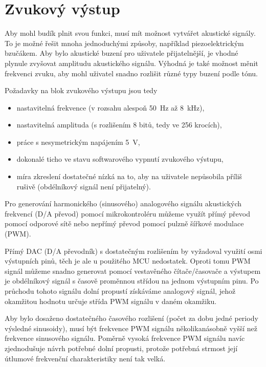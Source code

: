 \section{Zvukový výstup}
Aby mohl budík plnit svou funkci, musí mít možnost vytvářet akustické signály.
To je možné řešit mnoha jednoduchými způsoby, například piezoelektrickým
bzučákem. Aby bylo akustické buzení pro uživatele přijatelnější, je vhodné
plynule zvyšovat amplitudu akustického signálu. Výhodná je také možnost měnit
frekvenci zvuku, aby mohl uživatel snadno rozlišit různé typy buzení podle
tónu.

Požadavky na blok zvukového výstupu jsou tedy
\begin{itemize}[nosep]
    \item nastavitelná frekvence (v rozsahu alespoň \SI{50}{\hertz} až
        \SI{8}{\kilo\hertz}),
    \item nastavitelná amplituda (s rozlišením 8 bitů, tedy ve 256 krocích),
    \item práce s nesymetrickým napájením \SI{5}{\volt},
    \item dokonalé ticho ve stavu softwarového vypnutí zvukového výstupu,
    \item míra zkreslení dostatečné nízká na to, aby na uživatele nepůsobila
        příliš rušivě (obdélníkový signál není přijatelný).
\end{itemize}

Pro generování harmonického (sinusového) analogového signálu akustických
frekvencí (D/A převod) pomocí mikrokontroléru můžeme využít přímý převod pomocí
odporové sítě nebo nepřímý převod pomocí pulzně šířkové modulace (PWM).

Přímý DAC (D/A převodník) s dostatečným rozlišením by vyžadoval využití osmi
výstupních pinů, těch je ale u použitého MCU nedostatek. Oproti tomu PWM signál
můžeme snadno generovat pomocí vestavěného čítače/časovače a výstupem je
obdélníkový signál s časově proměnnou střídou na jednom výstupním pinu. Po
průchodu tohoto signálu dolní propustí získáváme analogový signál, jehož
okamžitou hodnotu určuje střída PWM signálu v daném okamžiku.

Aby bylo dosaženo dostatečného časového rozlišení (počet  za dobu
jedné periody výsledné sinusoidy), musí být frekvence PWM signálu
několikanásobně vyšší než frekvence sinusového signálu. Poměrně vysoká
frekvence PWM signálu navíc zjednodušuje návrh potřebné dolní propusti, protože
potřebná strmost její útlumové frekvenční charakteristiky není tak velká.

